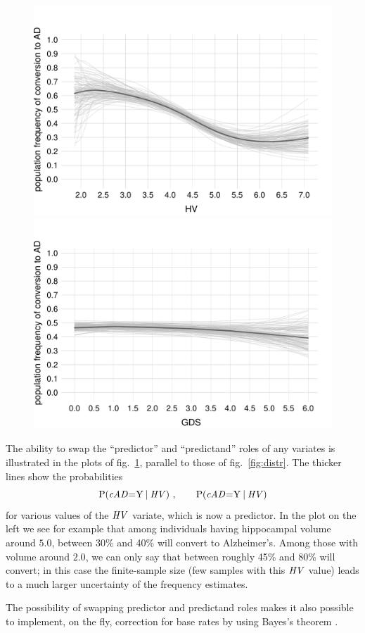 \begin{figure}[t]
\centering%
\includegraphics[width=0.45\linewidth]{figures/prob_conversion_HV.pdf}\hfill%
\includegraphics[width=0.45\linewidth]{figures/prob_conversion_GDS.pdf}%
\\ \caption{}\label{fig:distr_inv}
\end{figure}
The ability to swap the ``predictor'' and ``predictand'' roles of any variates is illustrated in the plots of fig.~\ref{fig:distr_inv}, parallel to those of fig.~\ref{fig:distr}. The thicker lines show the probabilities
\begin{equation*}
    \P( \cAD \mo \yy \| \HV)\ ,\qquad
  \P( \cAD \mo \yy \| \HV)
\end{equation*}
for various values of the $\mathit{HV}$ variate, which is now a predictor.
In the plot on the left we see for example that among individuals having hippocampal volume around $5.0$, between 30\% and 40\% will convert to Alzheimer's. Among those with volume around $2.0$, we can only say that between roughly 45\% and 80\% will convert; in this case the finite-sample size (few samples with this $\mathit{HV}$ value) leads to a much larger uncertainty of the frequency estimates.

The possibility of swapping predictor and predictand roles makes it also possible to implement, on the fly, correction for base rates by using Bayes's theorem \citep[\S\,4]{lindleyetal1981}.

\medskip

